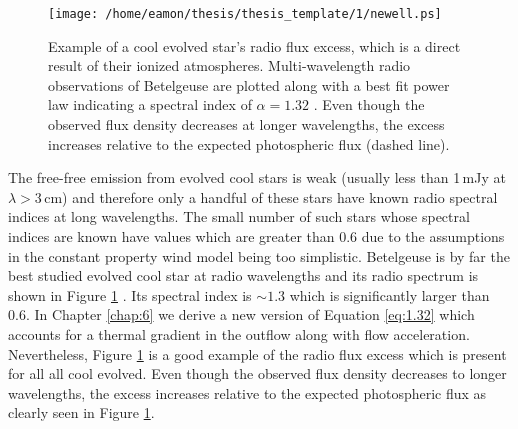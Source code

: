 \begin{figure}[hbt!]
\centering 
          \texttt{[image: /home/eamon/thesis/thesis\_template/1/newell.ps]}
\caption[Radio spectral index for Betelgeuse]{Example of a cool evolved star's radio flux excess, which is a direct result of their ionized atmospheres. Multi-wavelength radio observations of Betelgeuse are plotted along with a best fit power law indicating a spectral index of $\alpha = 1.32$ \citep{newell_1982}.  Even though the observed flux density decreases at longer wavelengths, the excess increases relative to the expected photospheric flux (dashed line).}
\label{fig:1.5.5}
\end{figure}

The free-free emission from evolved cool stars is weak (usually less than 1\,mJy at $\lambda > 3$\,cm) and therefore only a handful of these stars have known radio spectral indices at long wavelengths. The small number of such stars whose spectral indices are known have values which are greater than 0.6 \citep[e.g.][]{drake_1986} due to the assumptions in the constant property wind model being too simplistic. Betelgeuse is by far the best studied evolved cool star at radio wavelengths and its radio spectrum is shown in Figure \ref{fig:1.5.5} \citep{newell_1982}. Its spectral index is $\sim 1.3$ which is significantly larger than 0.6. In Chapter \ref{chap:6} we derive a new version of Equation \ref{eq:1.32} which accounts for a thermal gradient in the outflow along with flow acceleration. Nevertheless, Figure \ref{fig:1.5.5} is a good example of the radio flux excess which is present for all all cool evolved. Even though the observed flux density decreases to longer wavelengths, the excess increases relative to the expected photospheric flux as clearly seen in Figure \ref{fig:1.5.5}.

